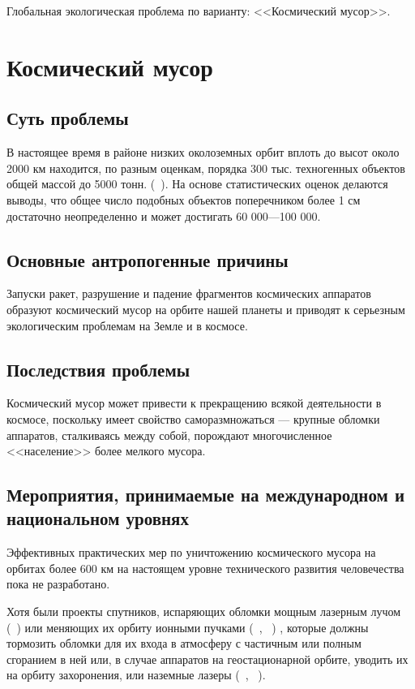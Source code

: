 \documentclass[a4paper,12pt]{article}
\begin{document}
	Глобальная экологическая проблема по варианту: <<Космический мусор>>.
	
	\section*{Космический мусор}
	
	\subsection*{Суть проблемы}
	
	В настоящее время в районе низких околоземных орбит вплоть до высот около 2000 км находится, по разным оценкам, порядка 300 тыс. техногенных объектов общей массой до 5000 тонн. (~\cite{OOH}). На основе статистических оценок делаются выводы, что общее число подобных объектов поперечником более 1 см достаточно неопределенно и может достигать 60 000—100 000.
	
	
	
	\subsection*{Основные антропогенные причины}
	
	Запуски ракет, разрушение и падение фрагментов космических аппаратов образуют космический мусор на орбите нашей планеты и приводят к серьезным экологическим проблемам на Земле и в космосе.
	
	\subsection*{Последствия проблемы}
	
	Космический мусор может привести к прекращению всякой деятельности в космосе, поскольку имеет свойство саморазмножаться — крупные обломки аппаратов, сталкиваясь между собой, порождают многочисленное <<население>> более мелкого мусора.
	
	\subsection*{Мероприятия, принимаемые на международном и национальном уровнях}
	
	Эффективных практических мер по уничтожению космического мусора на орбитах более 600 км на настоящем уровне технического развития человечества пока не разработано.
	
	Хотя были проекты спутников, испаряющих обломки мощным лазерным лучом (~\cite{1}) или меняющих их орбиту ионными пучками (~\cite{2}, ~\cite{3}) , которые должны тормозить обломки для их входа в атмосферу с частичным или полным сгоранием в ней или, в случае аппаратов на геостационарной орбите, уводить их на орбиту захоронения, или наземные лазеры (~\cite{4}, ~\cite{5}).
	
\end{document}
